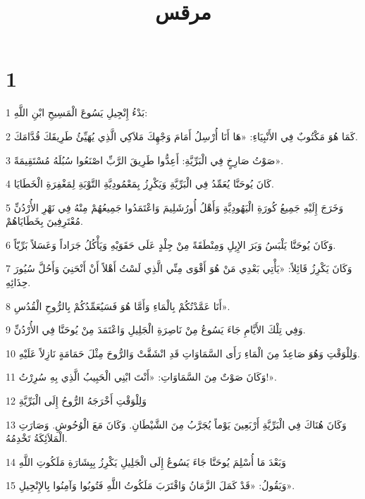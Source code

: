 

\title{مرقس}


\chapter{1}

\par 1 بَدْءُ إِنْجِيلِ يَسُوعَ الْمَسِيحِ ابْنِ اللَّهِ:
\par 2 كَمَا هُوَ مَكْتُوبٌ فِي الأَنْبِيَاءِ: «هَا أَنَا أُرْسِلُ أَمَامَ وَجْهِكَ مَلاَكِي الَّذِي يُهَيِّئُ طَرِيقَكَ قُدَّامَكَ.
\par 3 صَوْتُ صَارِخٍ فِي الْبَرِّيَّةِ: أَعِدُّوا طَرِيقَ الرَّبِّ اصْنَعُوا سُبُلَهُ مُسْتَقِيمَةً».
\par 4 كَانَ يُوحَنَّا يُعَمِّدُ فِي الْبَرِّيَّةِ وَيَكْرِزُ بِمَعْمُودِيَّةِ التَّوْبَةِ لِمَغْفِرَةِ الْخَطَايَا.
\par 5 وَخَرَجَ إِلَيْهِ جَمِيعُ كُورَةِ الْيَهُودِيَّةِ وَأَهْلُ أُورُشَلِيمَ وَاعْتَمَدُوا جَمِيعُهُمْ مِنْهُ فِي نَهْرِ الأُرْدُنِّ مُعْتَرِفِينَ بِخَطَايَاهُمْ.
\par 6 وَكَانَ يُوحَنَّا يَلْبَسُ وَبَرَ الإِبِلِ وَمِنْطَقَةً مِنْ جِلْدٍ عَلَى حَقَوَيْهِ وَيَأْكُلُ جَرَاداً وَعَسَلاً بَرِّيّاً.
\par 7 وَكَانَ يَكْرِزُ قَائِلاً: «يَأْتِي بَعْدِي مَنْ هُوَ أَقْوَى مِنِّي الَّذِي لَسْتُ أَهْلاً أَنْ أَنْحَنِيَ وَأَحُلَّ سُيُورَ حِذَائِهِ.
\par 8 أَنَا عَمَّدْتُكُمْ بِالْمَاءِ وَأَمَّا هُوَ فَسَيُعَمِّدُكُمْ بِالرُّوحِ الْقُدُسِ».
\par 9 وَفِي تِلْكَ الأَيَّامِ جَاءَ يَسُوعُ مِنْ نَاصِرَةِ الْجَلِيلِ وَاعْتَمَدَ مِنْ يُوحَنَّا فِي الأُرْدُنِّ.
\par 10 وَلِلْوَقْتِ وَهُوَ صَاعِدٌ مِنَ الْمَاءِ رَأَى السَّمَاوَاتِ قَدِ انْشَقَّتْ وَالرُّوحَ مِثْلَ حَمَامَةٍ نَازِلاً عَلَيْهِ.
\par 11 وَكَانَ صَوْتٌ مِنَ السَّمَاوَاتِ: «أَنْتَ ابْنِي الْحَبِيبُ الَّذِي بِهِ سُرِرْتُ!».
\par 12 وَلِلْوَقْتِ أَخْرَجَهُ الرُّوحُ إِلَى الْبَرِّيَّةِ
\par 13 وَكَانَ هُنَاكَ فِي الْبَرِّيَّةِ أَرْبَعِينَ يَوْماً يُجَرَّبُ مِنَ الشَّيْطَانِ. وَكَانَ مَعَ الْوُحُوشِ. وَصَارَتِ الْمَلاَئِكَةُ تَخْدِمُهُ.
\par 14 وَبَعْدَ مَا أُسْلِمَ يُوحَنَّا جَاءَ يَسُوعُ إِلَى الْجَلِيلِ يَكْرِزُ بِبِشَارَةِ مَلَكُوتِ اللَّهِ
\par 15 وَيَقُولُ: «قَدْ كَمَلَ الزَّمَانُ وَاقْتَرَبَ مَلَكُوتُ اللَّهِ فَتُوبُوا وَآمِنُوا بِالإِنْجِيلِ».
